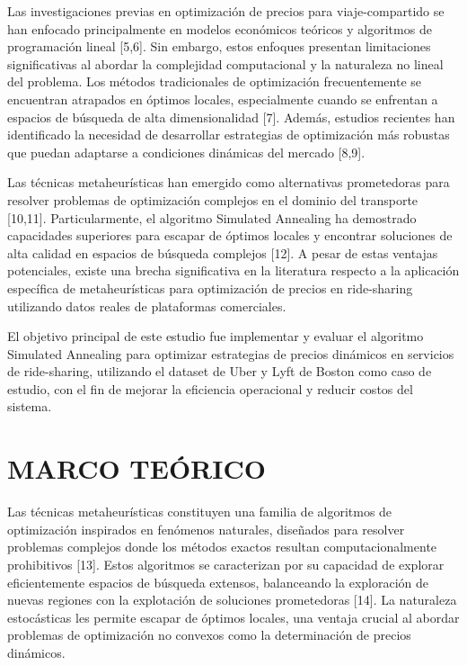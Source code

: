 \documentclass[12pt,a4paper,twocolumn]{article}
\begin{document}
Las investigaciones previas en optimización de precios para viaje-compartido
 se han enfocado principalmente en modelos económicos teóricos y algoritmos de programación lineal [5,6]. Sin embargo, estos enfoques presentan limitaciones significativas al abordar la complejidad computacional y la naturaleza no lineal del problema. Los métodos tradicionales de optimización frecuentemente se encuentran atrapados en óptimos locales, especialmente cuando se enfrentan a espacios de búsqueda de alta dimensionalidad [7]. Además, estudios recientes han identificado la necesidad de desarrollar estrategias de optimización más robustas que puedan adaptarse a condiciones dinámicas del mercado [8,9].

Las técnicas metaheurísticas han emergido como alternativas prometedoras para resolver problemas de optimización complejos en el dominio del transporte [10,11]. Particularmente, el algoritmo Simulated Annealing ha demostrado capacidades superiores para escapar de óptimos locales y encontrar soluciones de alta calidad en espacios de búsqueda complejos [12]. A pesar de estas ventajas potenciales, existe una brecha significativa en la literatura respecto a la aplicación específica de metaheurísticas para optimización de precios en ride-sharing utilizando datos reales de plataformas comerciales.

El objetivo principal de este estudio fue implementar y evaluar el algoritmo Simulated Annealing para optimizar estrategias de precios dinámicos en servicios de ride-sharing, utilizando el dataset de Uber y Lyft de Boston como caso de estudio, con el fin de mejorar la eficiencia operacional y reducir costos del sistema.

\section{MARCO TEÓRICO}

Las técnicas metaheurísticas constituyen una familia de algoritmos de optimización inspirados en fenómenos naturales, diseñados para resolver problemas complejos donde los métodos exactos resultan computacionalmente prohibitivos [13]. Estos algoritmos se caracterizan por su capacidad de explorar eficientemente espacios de búsqueda extensos, balanceando la exploración de nuevas regiones con la explotación de soluciones prometedoras [14]. La naturaleza estocásticas les permite escapar de óptimos locales, una ventaja crucial al abordar problemas de optimización no convexos como la determinación de precios dinámicos.
\end{document}
